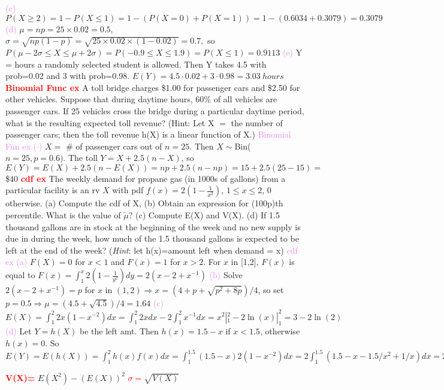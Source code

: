 \documentclass[10pt]{extarticle}
\newcommand{\dist}[3]{${#1}\mathtt{\sim}${#2}(${#3})$}
\newcommand{\re}[1]{\textcolor{red}{\textbf{#1}}}
\newcommand{\pr}[1]{\textcolor{violet}{#1}}
\begin{document}
		\pr{(c)} $P(X\geq 2)=1-P(X\leq 1)= 1 - (P(X=0)+P(X=1))=1 - (0.6034+0.3079) = 0.3079$
		\pr{(d)} $\mu = np = 25\times 0.02 = 0.5$, $\sigma=\sqrt{np(1-p)} = \sqrt{25\times 0.02
			\times (1-0.02)} = 0.7,$ so $P(\mu - 2\sigma \leq X \leq \mu+2\sigma)
			= P(-0.9\leq X \leq 1.9) = P(X\leq 1) = 0.9113$
		\pr{(e)} Y = hours a randomly selected student is allowed. Then Y takes 4.5 with
			prob=0.02 and 3 with prob=0.98. $E(Y)=4.5\cdot 0.02 + 3\cdot 0.98=3.03~hours$
	\re{Binomial Func ex} A toll bridge charges \$1.00 for passenger cars and \$2.50 for other
		vehicles. Suppose that during daytime hours, 60\% of all vehicles are passenger cars. If 25
		vehicles cross the bridge during a particular daytime period, what is the resulting
		expected toll revenue? (Hint: Let X $=$ the number of passenger cars; then the toll revenue
		h(X) is a linear function of X.)
	\pr{Binomial Fun ex}
		\pr{{($\cdot$)}} $X=$ \# of passenger cars out of $n=25$. Then \dist{X}{Bin}{n=25,p=0.6}. 
			The toll $Y=X+2.5(n-X)$, so $E(Y)=E(X)+2.5(n-E(X))=np+2.5(n-np)=15+2.5(25-15)=$\$40
	\re{cdf ex} The weekly demand for propane gas (in 1000s of gallons) from a particular
	facility is an rv $X$ with pdf $f(x) = 2(1-\frac{1}{x^{2}})$, $1\leq x \leq 2$, $0$ otherwise.
	(a) Compute the cdf of X, (b) Obtain an expression for (100p)th percentile. What is the value
	of $\tilde\mu$? (c) Compute E(X) and V(X). (d) If 1.5 thousand gallons are in stock at the
	beginning of the week and no new supply is due in during the week, how much of the 1.5
	thousand gallons is expected to be left at the end of the week? (\emph{Hint}: let h(x)=amount
	left when demand = x)
	\pr{cdf ex}
		\pr{(a)} $F(X)=0$ for $x<1$ and $F(x)=1$ for $x>2$. For $x$ in [1,2], $F(x)$ is equal to
			$F(x) = \int_{1}^{x} 2(1-\frac{1}{y^{2}})dy = 2(x-2+x^{-1})$
		\pr{(b)} Solve $2(x-2+x^{-1})=p$ for $x$ in $(1,2) \Rightarrow x=(4+p+\sqrt{p^{2}+8p})/4$,
			 so set $p=0.5 \Rightarrow \mu = (4.5+\sqrt{4.5})/4 = 1.64$
		\pr{(c)} $E(X) = \int_{1}^{2} 2x (1-x^{-2})dx = \int_{1}^{2} 2xdx
			- 2\int_{1}^{2}x^{-1}dx = x^{2}|_{1}^{2} - 2\ln{(x)}|_{1}^{2}=3-2\ln{(2)}$
		\pr{(d)} Let $Y=h(X)$ be the left amt. Then $h(x)=1.5-x$ if $x<1.5$, otherwise $h(x)=0$.
			So $E(Y)=E(h(X)) = \int_{1}^{2}h(x)f(x)dx=\int_{1}^{1.5}(1.5-x)2(1-x^{-2})dx
				= 2\int_{1}^{1.5}(1.5-x-1.5/x^{2}+1/x)dx
				=2(1.5\times 0.5 -(1.5^{2}-1)/2 - 1.5\times (1-1/1.5) + \ln{1.5})=0.061$	
	
	
	\pagebreak
	\re{V(X)=} $E(X^{2})-(E(X))^{2}$
	\re{$\sigma =$}$\sqrt{V(X)}$
	
	
\end{document}
